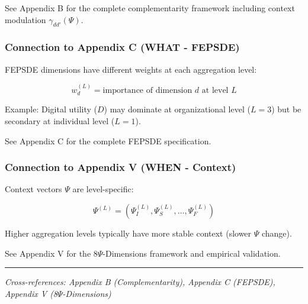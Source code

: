 See Appendix B for the complete complementarity framework including context 
modulation $\gamma_{dd'}(\Psi)$.

\subsubsection{Connection to Appendix C (WHAT - FEPSDE)}

FEPSDE dimensions have different weights at each aggregation level:

\begin{equation}
w_d^{(L)} = \text{importance of dimension } d \text{ at level } L
\end{equation}

Example: Digital utility ($D$) may dominate at organizational level ($L=3$) 
but be secondary at individual level ($L=1$).

See Appendix C for the complete FEPSDE specification.

\subsubsection{Connection to Appendix V (WHEN - Context)}

Context vectors $\Psi$ are level-specific:

\begin{equation}
\Psi^{(L)} = (\Psi_I^{(L)}, \Psi_S^{(L)}, \ldots, \Psi_F^{(L)})
\end{equation}

Higher aggregation levels typically have more stable context (slower $\Psi$ change).

See Appendix V for the 8$\Psi$-Dimensions framework and empirical validation.

\vspace{0.5em}
\hrule
\vspace{0.5em}
\noindent\textit{Cross-references: Appendix B (Complementarity), 
Appendix C (FEPSDE), Appendix V (8$\Psi$-Dimensions)}

